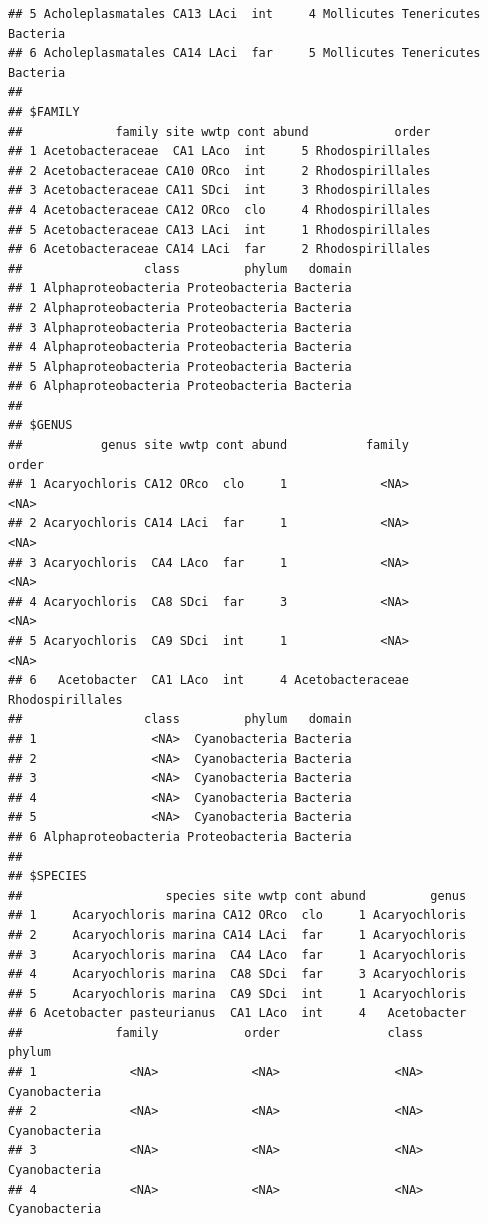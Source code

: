\documentclass[letterpaper,12pt]{article}\usepackage[]{graphicx}\usepackage[]{color}
\makeatletter
\newenvironment{kframe}{%
 \def\at@end@of@kframe{}%
 \ifinner\ifhmode%
  \def\at@end@of@kframe{\end{minipage}}%
  \begin{minipage}{\columnwidth}%
 \fi\fi%
 \def\FrameCommand##1{\hskip\@totalleftmargin \hskip-\fboxsep
 \colorbox{shadecolor}{##1}\hskip-\fboxsep
     \hskip-\linewidth \hskip-\@totalleftmargin \hskip\columnwidth}%
 \MakeFramed {\advance\hsize-\width
   \@totalleftmargin\z@ \linewidth\hsize
   \@setminipage}}%
 {\par\unskip\endMakeFramed%
 \at@end@of@kframe}
\newenvironment{knitrout}{}{} %
\makeatother
\begin{document}
\begin{knitrout}
\begin{kframe}
\begin{verbatim}
## 5 Acholeplasmatales CA13 LAci  int     4 Mollicutes Tenericutes Bacteria
## 6 Acholeplasmatales CA14 LAci  far     5 Mollicutes Tenericutes Bacteria
## 
## $FAMILY
##             family site wwtp cont abund            order
## 1 Acetobacteraceae  CA1 LAco  int     5 Rhodospirillales
## 2 Acetobacteraceae CA10 ORco  int     2 Rhodospirillales
## 3 Acetobacteraceae CA11 SDci  int     3 Rhodospirillales
## 4 Acetobacteraceae CA12 ORco  clo     4 Rhodospirillales
## 5 Acetobacteraceae CA13 LAci  int     1 Rhodospirillales
## 6 Acetobacteraceae CA14 LAci  far     2 Rhodospirillales
##                 class         phylum   domain
## 1 Alphaproteobacteria Proteobacteria Bacteria
## 2 Alphaproteobacteria Proteobacteria Bacteria
## 3 Alphaproteobacteria Proteobacteria Bacteria
## 4 Alphaproteobacteria Proteobacteria Bacteria
## 5 Alphaproteobacteria Proteobacteria Bacteria
## 6 Alphaproteobacteria Proteobacteria Bacteria
## 
## $GENUS
##           genus site wwtp cont abund           family            order
## 1 Acaryochloris CA12 ORco  clo     1             <NA>             <NA>
## 2 Acaryochloris CA14 LAci  far     1             <NA>             <NA>
## 3 Acaryochloris  CA4 LAco  far     1             <NA>             <NA>
## 4 Acaryochloris  CA8 SDci  far     3             <NA>             <NA>
## 5 Acaryochloris  CA9 SDci  int     1             <NA>             <NA>
## 6   Acetobacter  CA1 LAco  int     4 Acetobacteraceae Rhodospirillales
##                 class         phylum   domain
## 1                <NA>  Cyanobacteria Bacteria
## 2                <NA>  Cyanobacteria Bacteria
## 3                <NA>  Cyanobacteria Bacteria
## 4                <NA>  Cyanobacteria Bacteria
## 5                <NA>  Cyanobacteria Bacteria
## 6 Alphaproteobacteria Proteobacteria Bacteria
## 
## $SPECIES
##                    species site wwtp cont abund         genus
## 1     Acaryochloris marina CA12 ORco  clo     1 Acaryochloris
## 2     Acaryochloris marina CA14 LAci  far     1 Acaryochloris
## 3     Acaryochloris marina  CA4 LAco  far     1 Acaryochloris
## 4     Acaryochloris marina  CA8 SDci  far     3 Acaryochloris
## 5     Acaryochloris marina  CA9 SDci  int     1 Acaryochloris
## 6 Acetobacter pasteurianus  CA1 LAco  int     4   Acetobacter
##             family            order               class         phylum
## 1             <NA>             <NA>                <NA>  Cyanobacteria
## 2             <NA>             <NA>                <NA>  Cyanobacteria
## 3             <NA>             <NA>                <NA>  Cyanobacteria
## 4             <NA>             <NA>                <NA>  Cyanobacteria

\end{verbatim}
\end{kframe}
\end{knitrout}
\end{document}
